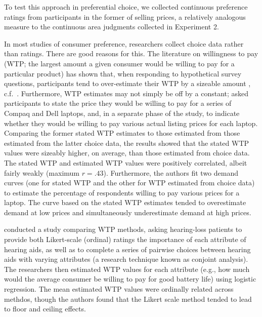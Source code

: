 To test this approach in preferential choice, we collected continuous preference ratings from participants in the former of selling prices, a relatively analogous measure to the continuous area judgments collected in Experiment 2. 

In most studies of consumer preference, researchers collect choice data rather than ratings. There are good reasons for this. The literature on willingness to pay (WTP; the largest amount a given consumer would be willing to pay for a particular product) has shown that, when responding to hypothetical survey questions, participants tend to over-estimate their WTP by a sizeable amount \parencite{breidertREVIEWMETHODSMEASURING2006,schmidtAccuratelyMeasuringWillingness2020}, c.f.~\textcite{miller2011should}. Furthermore, WTP estimates may not simply be off by a constant; \textcite{jedidi2002augmenting} asked participants to state the price they would be willing to pay for a series of Compaq and Dell laptops, and, in a separate phase of the study, to indicate whether they would be willing to pay various actual listing prices for each laptop. Comparing the former stated WTP estimates to those estimated from those estimated from the latter choice data, the results showed that the stated WTP values were sizeably higher, on average, than those estimated from choice data. The stated WTP and estimated WTP values were positively correlated, albeit fairly weakly (maximum $r=.43$). Furthermore, the authors fit two demand curves (one for stated WTP and the other for WTP estimated from choice data) to estimate the percentage of respondents willing to pay various prices for a laptop. The curve based on the stated WTP estimates tended to overestimate demand at low prices and simultaneously underestimate demand at high prices.

\textcite{bridges2012consumer} conducted a study comparing WTP methods, asking hearing-loss patients to provide both Likert-scale (ordinal) ratings the importance of each attribute of hearing aids, as well as to complete a series of pairwise choices between hearing aids with varying attributes (a research technique known as conjoint analysis). The researchers then estimated WTP values for each attribute (e.g., how much would the average consumer be willing to pay for good battery life) using logistic regression. The mean estimated WTP values were ordinally related across methdos, though the authors found that the Likert scale method tended to lead to floor and ceiling effects. 

